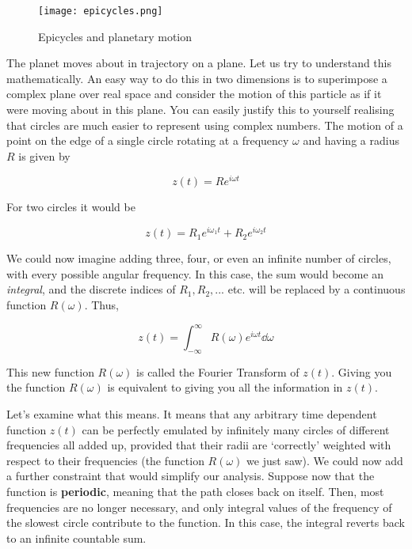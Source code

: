 \begin{figure}[!htb]
\centering
\texttt{[image: epicycles.png]}
\caption{Epicycles and planetary motion}
\label{epicycles}
\end{figure}

The planet moves about in trajectory on a plane. Let us try to understand this mathematically. An easy way to do this in two dimensions is to superimpose a complex plane over real space and consider the motion of this particle as if it were moving about in this plane. You can easily justify this to yourself realising that circles are much easier to represent using complex numbers. The motion of a point on the edge of a single circle rotating at a frequency $\omega$ and having a radius $R$ is given by

\begin{equation*}
z(t) = R e^{i \omega t}
\end{equation*}

For two circles it would be 


\begin{equation*}
z(t) = R_1 e^{i \omega_1 t} + R_2 e^{i \omega_2 t}
\end{equation*}

We could now imagine adding three, four, or even an infinite number of circles, with every possible angular frequency. In this case, the sum would become an \textit{integral}, and the discrete indices of $R_1, R_2, ...$ etc. will be replaced by a continuous function $R(\omega)$. Thus,


\begin{equation*}
z(t) = \int^\infty_{-\infty} R(\omega) e^{i \omega t} \dd \omega
\end{equation*}

This new function $R(\omega)$ is called the Fourier Transform of $z(t)$. Giving you the function $R(\omega)$ is equivalent to giving you all the information in $z(t)$.

Let's examine what this means. It means that any arbitrary time dependent function $z(t)$ can be perfectly emulated by infinitely many circles of different frequencies all added up, provided that their radii are `correctly' weighted with respect to their frequencies (the function $R(\omega)$ we just saw). We could now add a further constraint that would simplify our analysis. Suppose now that the function is \textbf{periodic}, meaning that the path closes back on itself. Then, most frequencies  are no longer necessary, and only integral values of the frequency of the slowest circle contribute to the function. In this case, the integral reverts back to an infinite countable sum.


